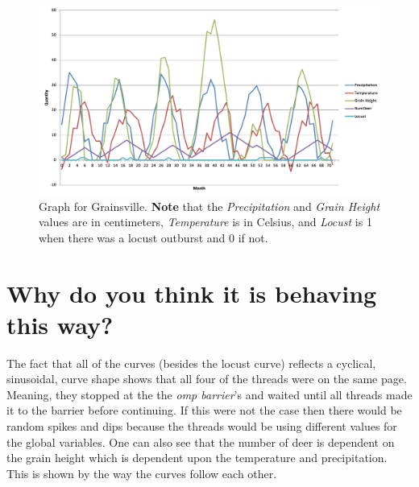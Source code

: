 \documentclass[onecolumn,draftclsnofoot, 10pt, compsoc]{IEEEtran}
\begin{document}
	\begin{figure}[H]
		\includegraphics[width=18cm]{Graph}
		\centering
		\caption{Graph for Grainsville. \textbf{Note} that the \textit{Precipitation} and \textit{Grain Height} values are in centimeters, \textit{Temperature} is in Celsius, and \textit{Locust} is 1 when there was a locust outburst and 0 if not.}
	\end{figure}

	
\section{Why do you think it is behaving this way?}
	The fact that all of the curves (besides the locust curve) reflects a cyclical, sinusoidal, curve shape shows that all four of the threads were on the same page.
	Meaning, they stopped at the the \textit{omp barrier}'s and waited until all threads made it to the barrier before continuing.
	If this were not the case then there would be random spikes and dips because the threads would be using different values for the global variables.
	One can also see that the number of deer is dependent on the grain height which is dependent upon the temperature and precipitation.
	This is shown by the way the curves follow each other.
	
\end{document}

